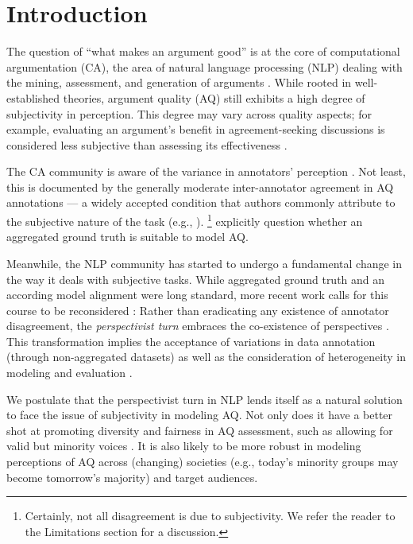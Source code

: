 \section{Introduction}
\label{sec:introduction}

The question of ``what makes an argument good'' is at the core of computational argumentation (CA), the area of natural language processing (NLP) dealing with the mining, assessment, and generation of arguments \cite{stede_argumentation_2019, lauscher2022survey}. While rooted in well-established theories, argument quality (AQ) still exhibits a high degree of subjectivity in perception. This degree may vary across quality aspects; for example, evaluating an argument's benefit in agreement-seeking discussions is considered less subjective than assessing its effectiveness \cite{wachsmuth-etal-2017-computational}.\,\,

The CA community is aware of the variance in annotators' perception \cite{stab-gurevych-2014-annotating, teruel-etal-2018-increasing, hautli-janisz-etal-2022-disagreement}. Not least, this is documented by the generally moderate inter-annotator agreement in AQ annotations --- a widely accepted condition that authors commonly attribute to the subjective nature of the task (e.g., \citealt{wachsmuth-etal-2017-computational, Gretz_Friedman_Cohen-Karlik_Toledo_Lahav_Aharonov_Slonim_2020, ng-etal-2020-creating, ziegenbein-etal-2023-modeling}).%
\footnote{Certainly, not all disagreement is due to subjectivity. We refer the reader to the Limitations section for a discussion.}
\citet{wachsmuth-werner-2020-intrinsic} explicitly question whether an aggregated ground truth is suitable to model AQ.

Meanwhile, the NLP community has started to undergo a fundamental change in the way it deals with subjective tasks. While aggregated ground truth and an according model alignment were long standard, more recent work calls for this course to be reconsidered \cite{basile2020end,plank-2022-problem,cabitza_toward_2023,Frenda2024}: Rather than eradicating any existence of annotator disagreement, the \emph{perspectivist turn} embraces the co-existence of perspectives \cite{uma-etal-2021-semeval, davani-etal-2022-dealing, leonardelli-etal-2023-semeval}. This transformation implies the acceptance of variations in data annotation (through non-aggregated datasets) as well as the consideration of heterogeneity in modeling and evaluation \cite{uma-2021-survey, basile-etal-2021-need, plank-2022-problem}.

We postulate that the perspectivist turn in NLP lends itself as a natural solution to face the issue of subjectivity in modeling AQ. Not only does it have a better shot at promoting diversity and fairness in AQ assessment, such as allowing for valid but minority voices \cite{noble2012minority, prabhakaran-etal-2021-releasing}. It is also likely to be more robust in modeling perceptions of AQ across (changing) societies (e.g., today’s minority groups may become tomorrow’s majority) and target audiences.

